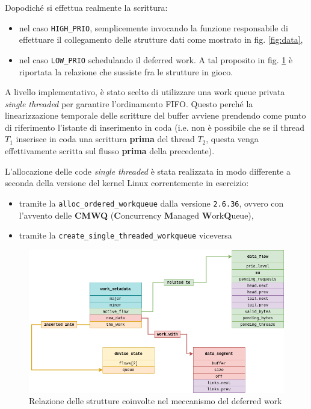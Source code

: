 \documentclass{article}
\begin{document}
Dopodiché si effettua realmente la scrittura:
\begin{itemize}
        \item nel caso \texttt{HIGH\_PRIO}, semplicemente invocando la funzione responsabile di effettuare il collegamento delle strutture dati come mostrato in fig. \ref{fig:data},
        \item nel caso \texttt{LOW\_PRIO} schedulando il deferred work. A tal proposito in fig. \ref{fig:deferred_work} è riportata la relazione che sussiste fra le strutture in gioco.
\end{itemize}

A livello implementativo, è stato scelto di utilizzare una work queue privata \textit{single threaded} per garantire l'ordinamento FIFO. Questo perché la linearizzazione temporale delle scritture del buffer avviene prendendo come punto di riferimento l'istante di inserimento in coda (i.e. non è possibile che se il thread $T_1$ inserisce in coda una scrittura \textbf{prima} del thread $T_2$, questa venga effettivamente scritta sul flusso \textbf{prima} della precedente).

L'allocazione delle code \textit{single threaded} è stata realizzata in modo differente a seconda della versione del kernel Linux correntemente in esercizio:
\begin{itemize}
        \item tramite la \texttt{alloc\_ordered\_workqueue} dalla versione \texttt{2.6.36}, ovvero con l'avvento delle \textbf{CMWQ} (\textbf{C}oncurrency \textbf{M}anaged \textbf{W}ork\textbf{Q}ueue),
        \item tramite la \texttt{create\_single\_threaded\_workqueue} viceversa
\end{itemize}

\begin{figure}[htbp]
        \centering
        \includegraphics[width=.8\textwidth]{deferred_work}
        \caption{Relazione delle strutture coinvolte nel meccanismo del deferred work}
        \label{fig:deferred_work}
\end{figure}
\end{document}
